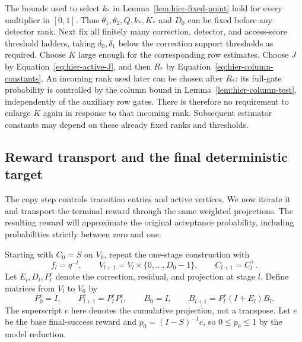 \begin{remark}
\label{rem:hier-constant-order}
The bounds used to select $k_*$ in
Lemma~\ref{lem:hier-fixed-point} hold for every multiplier in $[0,1]$.
Thus $\theta_1,\theta_2,Q,k_*,K_*$ and $D_0$ can be fixed before any
detector rank.  Next fix all finitely many correction, detector, and
access-score threshold ladders, taking $\delta_0,\delta_1$ below the
correction support thresholds as required.  Choose $K$ large enough for
the corresponding row estimates.  Choose $J$ by
Equation~\eqref{eq:hier-active-J}, and then $R_*$ by
Equation~\eqref{eq:hier-column-constants}.  An incoming rank used later
can be chosen after $R_*$: its full-gate probability is controlled by
the column bound in Lemma~\ref{lem:hier-column-test}, independently of
the auxiliary row gates.  There is therefore no requirement to enlarge
$K$ again in response to that incoming rank.  Subsequent estimator
constants may depend on these already fixed ranks and thresholds.
\end{remark}

\subsection{Reward transport and the final deterministic target}

The copy step controls transition entries and active vertices.  We now
iterate it and transport the terminal reward through the same weighted
projections.  The resulting reward will approximate the original
acceptance probability, including probabilities strictly between zero
and one.

Starting with $C_0=S$ on $V_0$, repeat the one-stage construction with
\[
 f_l=q^{-l},\qquad
 V_{l+1}=V_l\times\{0,\ldots,D_0-1\},\qquad C_{l+1}=C_l^+.
\]
Let $E_l,D_l,P_l^r$ denote the correction, residual, and projection at
stage $l$.  Define matrices from $V_l$ to $V_0$ by
\begin{equation}
 P_0^c=I,\qquad P_{l+1}^c=P_l^rP_l^c,
 \qquad B_0=I,\qquad B_{l+1}=P_l^r(I+E_l)B_l.
 \label{eq:hier-cumulative-matrices}
\end{equation}
The superscript $c$ here denotes the cumulative projection, not a
transpose.  Let $e$ be the base final-success reward and
$p_0=(I-S)^{-1}e$, so $0\leq p_0\leq1$ by the model reduction.

